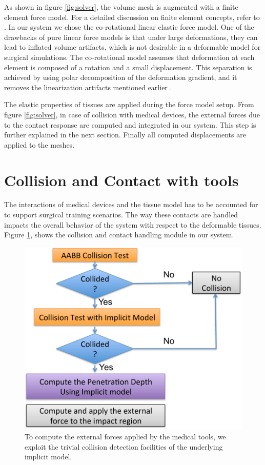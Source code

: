 As shown in figure \ref{fig:solver}, the volume mesh is augmented with a finite element force model. 
For a detailed discussion on finite element concepts, refer to \cite{bathe1996finite}. In our system we 
chose the co-rotational linear elastic force model. One of the drawbacks of pure linear force models is that under 
large deformations, they can lead to inflated volume artifacts, which is not desirable in a 
deformable model for surgical simulations. The co-rotational model assumes that deformation at each 
element is composed of a rotation and a small displacement. This separation is achieved by using polar 
decomposition of the deformation gradient, and it removes the linearization artifacts mentioned 
earlier \cite{bathe1996finite}.

The elastic properties of tissues are applied during the force model setup. From 
figure \ref{fig:solver}, in case of collision with medical devices, the external 
forces due to the contact response are computed and integrated in our system. This step is further explained
in the next section. Finally all computed displacements are applied to the meshes. 


\section{Collision and Contact with tools}
\label{sec:collisionsandcontacts}
The interactions of medical devices and the tissue model has to be accounted for to support surgical 
training scenarios. The way these contacts are handled impacts the overall behavior of the system with 
respect to the deformable tissues. Figure \ref{fig:contact}, shows the collision and contact handling 
module in our system.

\begin{figure}[H]
  \centering
  \includegraphics[width=0.8\linewidth]{figures/deformable/contact.pdf}
  \caption{\label{fig:contact}
  {To compute the external forces applied by the medical tools, we exploit the trivial collision detection 
  facilities of the underlying implicit model.}
}
\end{figure}

